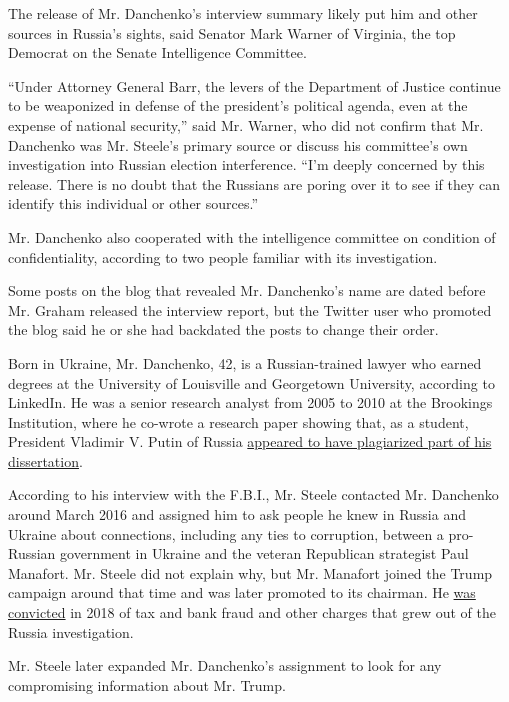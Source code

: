 The release of Mr. Danchenko's interview summary likely put him and
other sources in Russia's sights, said Senator Mark Warner of Virginia,
the top Democrat on the Senate Intelligence Committee.

``Under Attorney General Barr, the levers of the Department of Justice
continue to be weaponized in defense of the president's political
agenda, even at the expense of national security,'' said Mr. Warner, who
did not confirm that Mr. Danchenko was Mr. Steele's primary source or
discuss his committee's own investigation into Russian election
interference. ``I'm deeply concerned by this release. There is no doubt
that the Russians are poring over it to see if they can identify this
individual or other sources.''

Mr. Danchenko also cooperated with the intelligence committee on
condition of confidentiality, according to two people familiar with its
investigation.

Some posts on the blog that revealed Mr. Danchenko's name are dated
before Mr. Graham released the interview report, but the Twitter user
who promoted the blog said he or she had backdated the posts to change
their order.

Born in Ukraine, Mr. Danchenko, 42, is a Russian-trained lawyer who
earned degrees at the University of Louisville and Georgetown
University, according to LinkedIn. He was a senior research analyst from
2005 to 2010 at the Brookings Institution, where he co-wrote a research
paper showing that, as a student, President Vladimir V. Putin of Russia
\href{https://www.washingtonpost.com/news/answer-sheet/wp/2014/03/18/russias-plagiarism-problem-even-putin-has-done-it/}{appeared
to have plagiarized part of his dissertation}.

According to his interview with the F.B.I., Mr. Steele contacted Mr.
Danchenko around March 2016 and assigned him to ask people he knew in
Russia and Ukraine about connections, including any ties to corruption,
between a pro-Russian government in Ukraine and the veteran Republican
strategist Paul Manafort. Mr. Steele did not explain why, but Mr.
Manafort joined the Trump campaign around that time and was later
promoted to its chairman. He
\href{https://www.nytimes3xbfgragh.onion/2019/03/13/us/politics/paul-manafort-sentencing.html}{was
convicted} in 2018 of tax and bank fraud and other charges that grew out
of the Russia investigation.

Mr. Steele later expanded Mr. Danchenko's assignment to look for any
compromising information about Mr. Trump.

